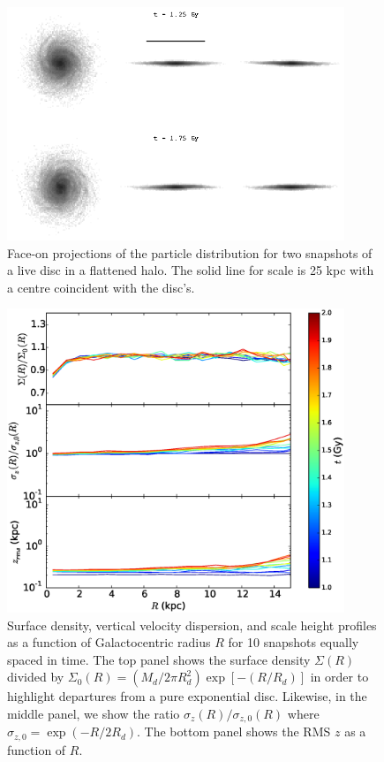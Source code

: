 \begin{figure}
\centering 
\includegraphics[width=0.9\textwidth]{../figures/Flattened_Selected_Density_Panels.eps}
\caption{Face-on projections of the particle distribution for two
  snapshots of a live disc in a flattened
  halo. The solid line for scale is 25 kpc with a centre
  coincident with the disc's. }\label{fig:flattened_disk_warps}
\end{figure}

\begin{figure}
\centering
\includegraphics[width=0.9\textwidth]{../figures/flattened_surface_densities_fixed.eps}
\caption{Surface density, vertical velocity dispersion, and scale
  height profiles as a function of Galactocentric radius $R$ for 10
  snapshots equally spaced in time.  The top panel shows the surface
  density $\Sigma(R)$ divided by
  $\Sigma_0(R) = \left (M_d/2\pi R_d^2\right )\exp{\left[-\left
        (R/R_d\right ) \right]}$
  in order to highlight departures from a pure exponential disc.
  Likewise, in the middle panel, we show the ratio
  $\sigma_z(R)/\sigma_{z,0}(R)$ where $\sigma_{z,0} = \exp{(-R/2R_d)}$.
  The bottom panel shows the RMS $z$ as a function of $R$. }
\label{fig:flattened_surface_densities}
\end{figure}

